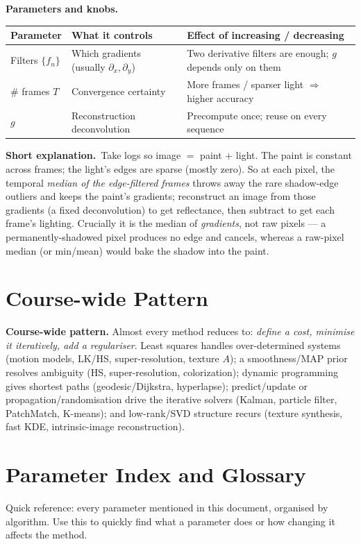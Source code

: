 \documentclass[10pt]{article}
\makeatletter
\newcommand{\Knobs}{\par\smallskip\textbf{Parameters and knobs.}\par\nopagebreak}
\newcommand{\ShortExp}{\par\smallskip\textbf{Short explanation.}\ }
\newenvironment{ptable}{\begin{center}\small\begin{tabular}{@{}p{2.5cm} p{5.9cm} p{6.2cm}@{}}\toprule
Parameter & What it controls & Effect of increasing / decreasing \\ \midrule}
{\bottomrule\end{tabular}\end{center}}
\makeatother
\begin{document}
\Knobs
\begin{ptable}
Filters $\{f_n\}$ & Which gradients (usually $\partial_x,\partial_y$) & Two derivative filters are enough; $g$ depends only on them \\
\# frames $T$ & Convergence certainty & More frames / sparser light $\Rightarrow$ higher accuracy \\
$g$ & Reconstruction deconvolution & Precompute once; reuse on every sequence \\
\end{ptable}
\ShortExp Take logs so image $=$ paint $+$ light. The paint is constant across frames; the light's edges are
sparse (mostly zero). So at each pixel, the temporal \emph{median of the edge-filtered frames} throws away
the rare shadow-edge outliers and keeps the paint's gradients; reconstruct an image from those gradients (a
fixed deconvolution) to get reflectance, then subtract to get each frame's lighting. Crucially it is the
median of \emph{gradients}, not raw pixels --- a permanently-shadowed pixel produces no edge and cancels,
whereas a raw-pixel median (or min/mean) would bake the shadow into the paint.

\newpage
\section*{Course-wide Pattern}
\begin{notebox}
\textbf{Course-wide pattern.} Almost every method reduces to: \emph{define a cost, minimise it iteratively,
add a regulariser}. Least squares handles over-determined systems (motion models, LK/HS, super-resolution,
texture $A$); a smoothness/MAP prior resolves ambiguity (HS, super-resolution, colorization); dynamic
programming gives shortest paths (geodesic/Dijkstra, hyperlapse); predict/update or
propagation/randomisation drive the iterative solvers (Kalman, particle filter, PatchMatch, K-means); and
low-rank/SVD structure recurs (texture synthesis, fast KDE, intrinsic-image reconstruction).
\end{notebox}

\newpage
\appendix
\section*{Parameter Index and Glossary}
Quick reference: every parameter mentioned in this document, organised by algorithm. Use this to
quickly find what a parameter does or how changing it affects the method.
\end{document}
